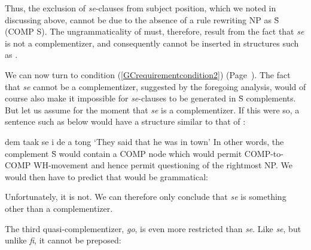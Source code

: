 \noindent Thus, the exclusion of \textit{se}-clauses from subject position, which we noted in discussing  above, cannot be due to the absence of a rule rewriting NP as \=S (COMP S). The ungrammaticality of  must, therefore, result from the fact that \textit{se} is not a complementizer, and consequently cannot be inserted in structures such as .

We can now turn to condition (\ref{GCrequirementcondition2}) (Page~\pageref{GCrequirementcondition2}). The fact that \textit{se} cannot be a complementizer, suggested by the foregoing analysis, would of course also make it impossible for \textit{se}-clauses to be generated in \=S complements. But let us assume for the moment that \textit{se} is a complementizer. If this were so, a sentence such as  below would have a structure similar to that of :

\ea\label{ex:2:208}
dem taak se i de a tong
\glt `They said that he was in town'
\z
In other words, the complement \=S would contain a COMP node which would permit COMP-to-COMP WH-movement and hence permit questioning of the rightmost NP. We would then have to predict that   would be grammatical:

\z
Unfortunately, it is not. We can therefore only conclude that \textit{se} is something other than a complementizer.

The third quasi-complementizer, \textit{go}, is even more restricted than \textit{se}. Like \textit{se}, but unlike \textit{fi}, it cannot be preposed:

\z

\z

\z
{}

